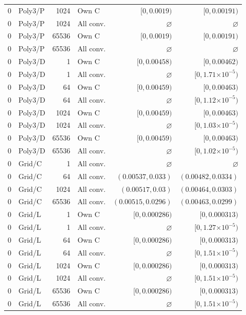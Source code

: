 \begin{longtable}{llrlrr}
0 & Poly3/P & 1024 & Own C & $[0, 0.0019)$ & $[0, 0.00191)$ \\
0 & Poly3/P & 1024 & All conv. & $\varnothing$ & $\varnothing$ \\
0 & Poly3/P & 65536 & Own C & $[0, 0.0019)$ & $[0, 0.00191)$ \\
0 & Poly3/P & 65536 & All conv. & $\varnothing$ & $\varnothing$ \\
0 & Poly3/D & 1 & Own C & $[0, 0.00458)$ & $[0, 0.00462)$ \\
0 & Poly3/D & 1 & All conv. & $\varnothing$ & $[0, 1.71\mathord{\times}10^{-5})$ \\
0 & Poly3/D & 64 & Own C & $[0, 0.00459)$ & $[0, 0.00463)$ \\
0 & Poly3/D & 64 & All conv. & $\varnothing$ & $[0, 1.12\mathord{\times}10^{-5})$ \\
0 & Poly3/D & 1024 & Own C & $[0, 0.00459)$ & $[0, 0.00463)$ \\
0 & Poly3/D & 1024 & All conv. & $\varnothing$ & $[0, 1.03\mathord{\times}10^{-5})$ \\
0 & Poly3/D & 65536 & Own C & $[0, 0.00459)$ & $[0, 0.00463)$ \\
0 & Poly3/D & 65536 & All conv. & $\varnothing$ & $[0, 1.02\mathord{\times}10^{-5})$ \\
0 & Grid/C & 1 & All conv. & $\varnothing$ & $\varnothing$ \\
0 & Grid/C & 64 & All conv. & $(0.00537, 0.033)$ & $(0.00482, 0.0334)$ \\
0 & Grid/C & 1024 & All conv. & $(0.00517, 0.03)$ & $(0.00464, 0.0303)$ \\
0 & Grid/C & 65536 & All conv. & $(0.00515, 0.0296)$ & $(0.00463, 0.0299)$ \\
0 & Grid/L & 1 & Own C & $[0, 0.000286)$ & $[0, 0.000313)$ \\
0 & Grid/L & 1 & All conv. & $\varnothing$ & $[0, 1.27\mathord{\times}10^{-5})$ \\
0 & Grid/L & 64 & Own C & $[0, 0.000286)$ & $[0, 0.000313)$ \\
0 & Grid/L & 64 & All conv. & $\varnothing$ & $[0, 1.51\mathord{\times}10^{-5})$ \\
0 & Grid/L & 1024 & Own C & $[0, 0.000286)$ & $[0, 0.000313)$ \\
0 & Grid/L & 1024 & All conv. & $\varnothing$ & $[0, 1.51\mathord{\times}10^{-5})$ \\
0 & Grid/L & 65536 & Own C & $[0, 0.000286)$ & $[0, 0.000313)$ \\
0 & Grid/L & 65536 & All conv. & $\varnothing$ & $[0, 1.51\mathord{\times}10^{-5})$ \\

\end{longtable}
